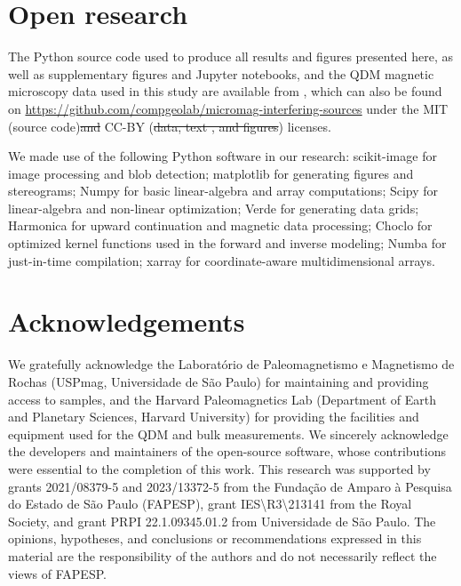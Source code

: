 \documentclass[onecolumn,12pt,a4paper]{article}
\newcommand{\GitHubRepository}{compgeolab/micromag-interfering-sources}
\providecommand{\DIFaddtex}[1]{{\protect\color{blue}\uwave{#1}}} %
\providecommand{\DIFdeltex}[1]{{\protect\color{red}\sout{#1}}}                      %
\providecommand{\DIFaddbegin}{} %
\providecommand{\DIFaddend}{} %
\providecommand{\DIFdelbegin}{} %
\providecommand{\DIFdelend}{} %
\providecommand{\DIFadd}[1]{\texorpdfstring{\DIFaddtex{#1}}{#1}} %
\providecommand{\DIFdel}[1]{\texorpdfstring{\DIFdeltex{#1}}{}} %
\newcommand{\DIFscaledelfig}{0.5}
\newlength{\DIFdelgraphicswidth} %
\newlength{\DIFdelgraphicsheight} %
\newcommand{\DIFaddincludegraphics}[2][]{{\color{blue}\fbox{\DIFOincludegraphics[#1]{#2}}}} %
\newcommand{\DIFdelincludegraphics}[2][]{%
\sbox{\DIFdelgraphicsbox}{\DIFOincludegraphics[#1]{#2}}%
\settoboxwidth{\DIFdelgraphicswidth}{\DIFdelgraphicsbox} %
\settoboxtotalheight{\DIFdelgraphicsheight}{\DIFdelgraphicsbox} %
\scalebox{\DIFscaledelfig}{%
\parbox[b]{\DIFdelgraphicswidth}{\usebox{\DIFdelgraphicsbox}\\[-\baselineskip] \rule{\DIFdelgraphicswidth}{0em}}\llap{\resizebox{\DIFdelgraphicswidth}{\DIFdelgraphicsheight}{%
\setlength{\unitlength}{\DIFdelgraphicswidth}%
\begin{picture}(1,1)%
\thicklines\linethickness{2pt} %
{\color[rgb]{1,0,0}\put(0,0){\framebox(1,1){}}}%
{\color[rgb]{1,0,0}\put(0,0){\line( 1,1){1}}}%
{\color[rgb]{1,0,0}\put(0,1){\line(1,-1){1}}}%
\end{picture}%
}\hspace*{3pt}}} %
} %
\DeclareRobustCommand{\DIFaddbegin}{\DIFOaddbegin \let\includegraphics\DIFaddincludegraphics} %
\DeclareRobustCommand{\DIFaddend}{\DIFOaddend \let\includegraphics\DIFOincludegraphics} %
\DeclareRobustCommand{\DIFdelbegin}{\DIFOdelbegin \let\includegraphics\DIFdelincludegraphics} %
\DeclareRobustCommand{\DIFdelend}{\DIFOaddend \let\includegraphics\DIFOincludegraphics} %
\begin{document}
\section{Open research}

The Python source code used to produce all results and figures presented here, as well as supplementary figures and Jupyter notebooks, and the QDM magnetic microscopy data used in this study are available from \citet{figshare}, which can also be found on \url{https://github.com/\GitHubRepository} under the MIT (source code)\DIFdelbegin \DIFdel{and }\DIFdelend \DIFaddbegin \DIFadd{, }\DIFaddend CC-BY (\DIFdelbegin \DIFdel{data, text , and figures}\DIFdelend \DIFaddbegin \DIFadd{text and figures), and CC-0 (data}\DIFaddend ) licenses.

We made use of the following Python software in our research:
scikit-image \citep{VanderWalt2014} for image processing and blob detection;
matplotlib \citep{Hunter2007} for generating figures and stereograms;
Numpy \citep{Harris2020} for basic linear-algebra and array computations;
Scipy \citep{2020SciPy-NMeth} for linear-algebra and non-linear optimization;
Verde \citep{verde2018} for generating data grids;
Harmonica \citep{harmonica2020} for upward continuation and magnetic data processing;
Choclo \citep{choclo2022} for optimized kernel functions used in the
forward and inverse modeling;
Numba \citep{lam2015numba} for just-in-time compilation;
xarray \citep{hoyer2017xarray} for coordinate-aware multidimensional arrays.

\section{Acknowledgements}

We gratefully acknowledge the Laboratório de Paleomagnetismo e Magnetismo de Rochas (USPmag, Universidade de São Paulo) for maintaining and providing access to samples, and the Harvard Paleomagnetics Lab (Department of Earth and Planetary Sciences, Harvard University) for providing the facilities and equipment used for the QDM and bulk measurements. We sincerely acknowledge the developers and maintainers of the open-source software, whose contributions were essential to the completion of this work. This research was supported by grants 2021/08379-5 and 2023/13372-5 from the Fundação de Amparo à Pesquisa do Estado de São Paulo (FAPESP), grant IES\textbackslash{}R3\textbackslash{}213141 from the Royal Society, and grant PRPI 22.1.09345.01.2 from Universidade de São Paulo.
The opinions, hypotheses, and conclusions or recommendations expressed in this material are the responsibility of the authors and do not necessarily reflect the views of FAPESP.






\end{document}

